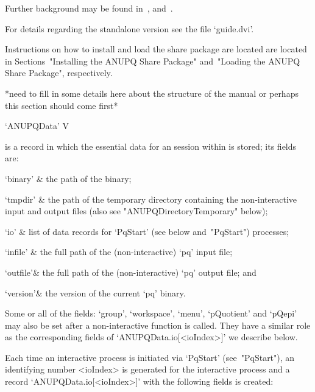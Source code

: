 \endlist

Further   background   may   be   found   in~\cite{OBr95},   \cite{Vau84}
and~\cite{NNN98}.

For details regarding the standalone version see the file `guide.dvi'.


Instructions on how to install and load the {\ANUPQ}  share  package  are
located are located in  Sections~"Installing  the  ANUPQ  Share  Package"
and~"Loading the ANUPQ Share Package", respectively.

*need to fill in some details here about the structure of the manual
 or perhaps this section should come first*


\>`ANUPQData' V

is a {\GAP} record in which the essential data for  an  {\ANUPQ}  session
within {\GAP} is stored; its fields are:

\beginitems

\quad`binary' & the path of the {\ANUPQ} binary;

\quad`tmpdir' & the  path  of  the  temporary  directory  containing  the
non-interactive   {\ANUPQ}   input   and   output   files    (also    see
"ANUPQDirectoryTemporary" below);

\quad`io' & list of data records for `PqStart' (see below  and~"PqStart")
processes;

\quad`infile' & the full path of the (non-interactive) `pq' input file;

\quad`outfile'& the full path of the (non-interactive) `pq' output  file;
and

\quad`version'& the version of the current `pq' binary.

\enditems

Some or all of the fields: `group', `workspace', `menu', `pQuotient'  and
`pQepi' may also be set after  a  non-interactive  {\ANUPQ}  function  is
called.  They  have  a  similar  role  as  the  corresponding  fields  of
`ANUPQData.io[<ioIndex>]' we describe below.

Each time an interactive {\ANUPQ}  process  is  initiated  via  `PqStart'
(see~"PqStart"), an identifying number <ioIndex>  is  generated  for  the
interactive process  and  a  record  `ANUPQData.io[<ioIndex>]'  with  the
following fields is created:

